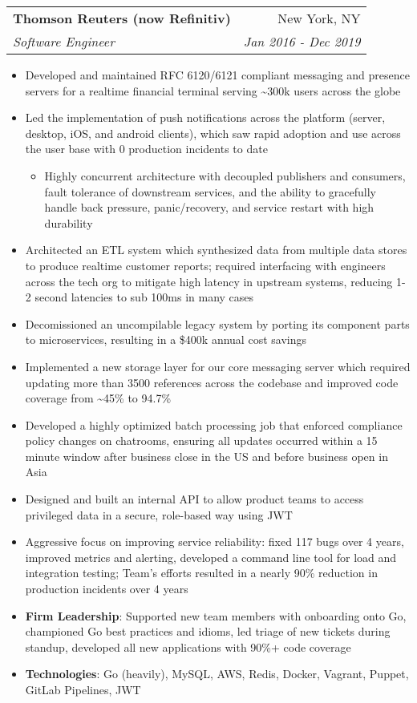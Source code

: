 \documentclass[letterpaper,11pt]{article}
\makeatletter
\newcommand{\resumeItem}[2]{
  \item\small{
    \textbf{#1}{: #2 \vspace{-2pt}}
  }
}
\newcommand{\resumeItemSimple}[1]{
  \item\small{
    {#1 \vspace{-2pt}}
  }
}
\newcommand{\resumeItemSimpleIndented}[1]{
  \item[--]\small{
    {#1 \vspace{-2pt}}
  }
}
\newcommand{\resumeSubheading}[4]{
  \vspace{-1pt}\item
    \begin{tabular*}{0.97\textwidth}[t]{l@{\extracolsep{\fill}}r}
      \textbf{#1} & #2 \\
      \textit{\small#3} & \textit{\small #4} \\
    \end{tabular*}\vspace{-5pt}
}
\newcommand{\resumeItemListStart}{\begin{itemize}}
\newcommand{\resumeItemListEnd}{\end{itemize}\vspace{-5pt}}
\makeatother
\begin{document}
    \resumeSubheading
      {Thomson Reuters (now Refinitiv)}{New York, NY}
      {Software Engineer}{Jan 2016 - Dec 2019}
      \resumeItemListStart
        \resumeItemSimple
          {Developed and maintained RFC 6120/6121 compliant messaging and presence servers for a realtime financial terminal serving \raisebox{-0.7ex}\textasciitilde 300k users across the globe}
        \resumeItemSimple
          {Led the implementation of push notifications across the platform (server, desktop, iOS, and android clients), which saw rapid adoption and use across the user base with 0 production incidents to date}
        \begin{itemize}[leftmargin=.2in]\resumeItemSimpleIndented
          {Highly concurrent architecture with decoupled publishers and consumers, fault tolerance of downstream services, and the ability to gracefully handle back pressure, panic/recovery, and service restart with high durability}
        \end{itemize}
        \resumeItemSimple
          {Architected an ETL system which synthesized data from multiple data stores to produce realtime customer reports; required interfacing with engineers across the tech org to mitigate high latency in upstream systems, reducing 1-2 second latencies to sub 100ms in many cases}
        \resumeItemSimple
          {Decomissioned an uncompilable legacy system by porting its component parts to microservices, resulting in a \$400k annual cost savings}
        \resumeItemSimple
          {Implemented a new storage layer for our core messaging server which required updating more than 3500 references across the codebase and improved code coverage from \raisebox{-0.7ex}\textasciitilde 45\% to 94.7\%}
        \resumeItemSimple
          {Developed a highly optimized batch processing job that enforced compliance policy changes on chatrooms, ensuring all updates occurred within a 15 minute window after business close in the US and before business open in Asia}
        \resumeItemSimple
          {Designed and built an internal API to allow product teams to access privileged data in a secure, role-based way using JWT}
        \resumeItemSimple
          {Aggressive focus on improving service reliability: fixed 117 bugs over 4 years, improved metrics and alerting, developed a command line tool for load and integration testing; Team's efforts resulted in a nearly 90\% reduction in production incidents over 4 years}
        \resumeItem{Firm Leadership}
        {Supported new team members with onboarding onto Go, championed Go best practices and idioms, led triage of new tickets during standup, developed all new applications with 90\%+ code coverage}
        \resumeItem{Technologies}
        {Go (heavily), MySQL, AWS, Redis, Docker, Vagrant, Puppet, GitLab Pipelines, JWT}
      \resumeItemListEnd
\end{document}
